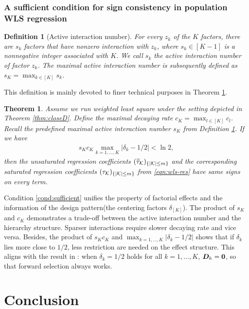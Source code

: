 \documentclass[12pt]{article}
\newtheorem{definition}{Definition}
\newtheorem{theorem}{Theorem}
\begin{document}
\subsubsection{A sufficient condition for sign consistency in population WLS regression}

\begin{definition}[Active interaction number]\label{def:sparsity}
For every $z_k$ of the $K$ factors, there are $s_k$ factors that have nonzero interaction with $z_k$, where $s_k\in [K-1]$ is a nonnegative integer associated with $K$. We call $s_k$ the active interaction number of factor $z_k$. The maximal active interaction number is subsequently defined as $s_K = \max_{k\in [K]} s_k$.
\end{definition}

This definition is mainly devoted to finer technical purposes in Theorem \ref{thm:suffcond}. 

\begin{theorem}\label{thm:suffcond}
Assume we run weighted least square under the setting depicted in  Theorem \ref{thm:closeD}. Define the maximal decaying rate $c_K=\max_{l\in[K]} c_l$. Recall the predefined maximal active interaction number $s_K$ from Definition \ref{def:sparsity}. If we have 
\begin{align}
s_Kc_K\max_{k=1,\dots,K} |\delta_k-1/2|<\ln 2, \label{cond:sufficient}
\end{align}
then the unsaturated regression coefficients
$(\widetilde{\tau}_{{\mathcal{K}}})_{\{|{\mathcal{K}}|\le m\}}$ and the corresponding saturated regression coefficients  $({\tau}_{{\mathcal{K}}})_{\{|{\mathcal{K}}|\le m\}}$ from \eqref{eqn:wls-res} have same signs on every term.

\end{theorem}

Condition \eqref{cond:sufficient} unifies the property of factorial effects and the information of the design pattern(the centering factors $\delta_{[K]}$). The product of $s_K$ and $c_K$ demonstrates a trade-off between the active interaction number and the hierarchy structure. Sparser interactions require slower decaying rate and vice versa. Besides, the product of $s_Kc_K$ and $\max_{k=1,\dots,K} |\delta_k-1/2|$ shows that if $\delta_k$ lies more close to $1/2$, less restriction are needed on the effect structure. This aligns with the result in \cite{zhao2021regression}: when $\delta_k=1/2$ holds for all $k=1,\dots, K$,  ${\boldsymbol{D}}_h=\boldsymbol{0}$, so that forward selection always works. 


\section{Conclusion}
\end{document}

